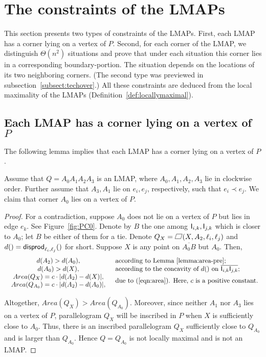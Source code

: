 \documentclass{ws-ijcga}
\begin{document}
\section{The constraints of the LMAPs}\label{sect:clamping}

This section presents two types of constraints of the LMAPs.
First, each LMAP has a corner lying on a vertex of $P$.
Second, for each corner of the LMAP,
  we distinguish $\Theta(n^2)$ situations and prove that under each situation
    this corner lies in a corresponding boundary-portion.
The situation depends on the locations of its two neighboring corners.
(The second type was previewed in subsection~\ref{subsect:techover}.)
All these constraints are deduced from the local maximality of the LMAPs (Definition~\ref{def:locallymaximal}).

\subsection{Each LMAP has a corner lying on a vertex of $P$}

The following lemma implies that each LMAP has a corner lying on a vertex of $P$.
\begin{lemma}\label{lemma:narrow_anchored}
Assume that $Q=A_0A_1A_2A_3$ is an LMAP, where $A_0,A_1,A_2,A_3$ lie in clockwise order.
Further assume that $A_3,A_1$ lie on $e_i,e_j$, respectively, such that $e_i\prec e_j$.
We claim that corner $A_0$ lies on a vertex of $P$.
\end{lemma}

\begin{proof}
For a contradiction, suppose $A_0$ does not lie on a vertex of $P$ but lies in edge $e_k$. See Figure~\ref{fig:PC0}.
Denote by $B$ the one among $\mathsf{I}_{i,k},\mathsf{I}_{j,k}$ which is closer to $A_0$; let $B$ be either of them for a tie.
Denote $Q_X=\parallelogram(X,A_2,\el_i,\el_j)$ and $d()=\mathsf{disprod}_{\ell_{i},\ell_{j}}()$ for short.
Suppose $X$ is any point on $\overline{A_0B}$ but $A_0$. Then,
\[
\begin{array}{cl}
  d(A_2)>d(A_0), & \hbox{according to Lemma~\ref{lemma:area-pre};} \\
  d(A_0)>d(X), & \hbox{according to the concavity of $d()$ on $\overline{\mathsf{I}_{i,k}\mathsf{I}_{j,k}}$;}\\
  \begin{array}{c}
     Area(Q_X)=c\cdot |d(A_2)-d(X)|,\\
     Area(Q_{A_0})=c\cdot |d(A_2)-d(A_0)|,
   \end{array} & \hbox{due to (\ref{eqn:area}). Here, $c$ is a positive constant.}
\end{array}\]

Altogether, $Area(Q_X)>Area(Q_{A_0})$.
Moreover, since neither $A_1$ nor $A_3$ lies on a vertex of $P$, parallelogram $Q_X$ will be inscribed in $P$ when $X$ is sufficiently close to $A_0$.
Thus, there is an inscribed parallelogram $Q_X$ sufficiently close to $Q_{A_0}$ and is larger than $Q_{A_0}$.
Hence $Q=Q_{A_0}$ is not locally maximal and is not an LMAP.
 \end{proof}
\end{document}
